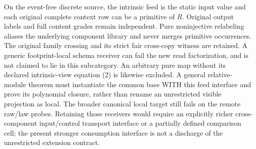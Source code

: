 \documentclass[11pt]{article}
\begin{document}
On the event-free discrete source, the intrinsic feed is the static input value and each original complete context row can be a primitive of $R$. Original output labels and full content grades remain independent. Pure noninjective relabeling aliases the underlying component library and never merges primitive occurrences. The original family crossing and its strict fair cross-copy witness are retained. A generic footprint-local schema receiver can fail the new read factorization, and is not claimed to lie in this subcategory. An arbitrary pure map without its declared intrinsic-view equation (2) is likewise excluded. A general relative-module theorem must instantiate the common base WITH this feed interface and prove its polynomial closure, rather than rename an unrestricted visible projection as local. The broader canonical local target still fails on the remote raw/law probes. Retaining those receivers would require an explicitly richer cross-component input/control transport interface or a partially defined comparison cell; the present stronger consumption interface is not a discharge of the unrestricted extension contract.
\end{document}
